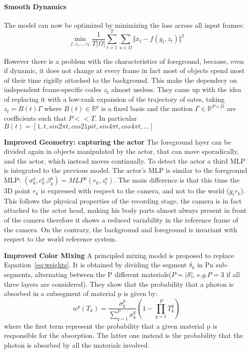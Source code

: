 \paragraph{Smooth Dynamics} The model can now be optimized by minimizing the loss across
all input frames:
\begin{equation}\label{eq:timeNdiff}
    \min_{f,z_1,...z_T} \frac{1}{T |\Omega|} \sum_{t=1}^{T} \sum_{u\in\Omega}\Vert x_t-f(g_t,z_t)\Vert^2 
\end{equation}

However there is a problem with the characteristics of foreground, because, even if 
dynamic, it does not change at every frame in fact most of objects spend most of 
their time rigidly attached to the background. This make the dependecy on independent
frame-specific codes $z_t$ almost useless. They came up with the idea of 
replacing it with a low-rank expansion of the trajectory of sates, taking 
$z_t = B(t) \Gamma$ where $B(t) \in \mathbb{R}^p$ is a fixed basis and the motion
$\Gamma \in \mathbb{R}^{P \times D}$ are coefficients such that $P << T$.
In particular $B(t)=[1,t,sin 2 \pi t, cos 2 1pi t, sin 4 \pi t, cos 4 \pi t,...]$

\textbf{Improved Geometry: capturing the actor}
The foreground layer can be divided again in objects manipulated by the actor,
 that can move sporadically, and the actor, which instead moves continually.
 To detect the actor a third MLP is integrated to the previous model.
 The actor's MLP is similar to the foreground MLP: $(\sigma_k^a,c_k^a.\beta_k^a) = MLP^a(r_k,z_t^a)$.
 The main difference is that this time the 3D point $r_k$ is expressed with respect 
 to the camera, and not to the world ($g_t r_k$). This follows the physical properties
 of the recording stage, the camera is in fact attached to the actor head, making his
 body parts almost always present in front of the camera therefore it shows a reduced
 variability in the reference frame of the camera. On the contrary, the background and 
 foreground is invariant with respect to the world reference system.

 \textbf{Improved Color Mixing}
A principled mixing model is proposed to replace Equation~\ref{eq:weights}. It is obtained
by dividing the segment $\delta_k$ in Pn sub-segments, alternating between the P different
materials($P = \vert \mathcal{S}\vert$, $e.g. P = 3$ if all three layers are considered).
They show that the probability that a photon is absorbed in a subsegment of material p
is given by:
\begin{equation}
    w^p(T_k) = \frac{\sigma_k^p}{\sum_{q=1}^P \sigma_k^q} (1-\prod_{q=1}^{P} T_k^q)
\end{equation}
where the first term represent the probability that a given material p is responsible
for the absorption. The latter one instead is the probability that the photon is absorbed by all 
the materials involved.

